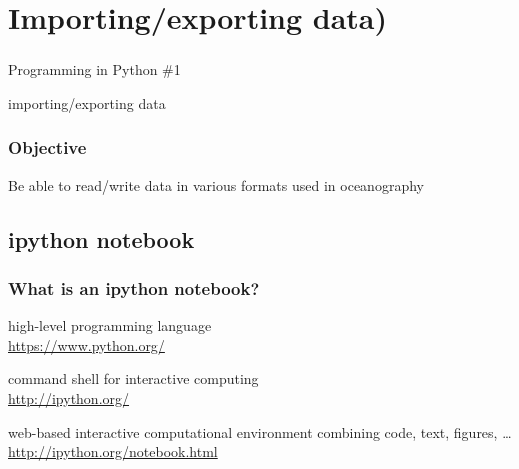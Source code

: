 \section{Importing/exporting data)}

{
\begin{frame}
\frametitle{}
{\fontsize{40}{50}\selectfont Programming in Python \#1} 

{\huge importing/exporting data} 

\end{frame}
}

\begin{frame}
\frametitle{Objective}

Be able to read/write data in various formats used in oceanography

\vfill 

\vfill 
{}

\end{frame}

\subsection{ipython notebook}

\begin{frame}[c]
\frametitle{What is an ipython notebook?}


\begin{description}
\item<2->[Python:] high-level programming language\\ 
\url{https://www.python.org/}
\item<3->[IPython:] command shell for interactive computing\\ 
\url{http://ipython.org/}
\item<4->[IPython notebook:] web-based interactive computational environment combining code, text, figures, \ldots\\
\url{http://ipython.org/notebook.html}
\end{description}

\end{frame}

